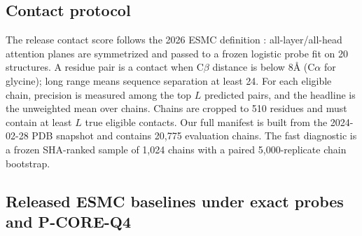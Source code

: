 \documentclass{article}
\begin{document}
\subsection{Contact protocol}

The release contact score follows the 2026 ESMC definition
\citep{candido2026language,rao2021unsupervised}: all-layer/all-head attention
planes are symmetrized and passed to a frozen logistic probe fit on 20
structures. A residue pair is a contact when C$\beta$ distance is below
8\AA{} (C$\alpha$ for glycine); long range means sequence separation at least
24. For each eligible chain, precision is measured among the top $L$ predicted
pairs, and the headline is the unweighted mean over chains. Chains are cropped
to 510 residues and must contain at least $L$ true eligible contacts. Our full
manifest is built from the 2024-02-28 PDB snapshot and contains 20,775
evaluation chains. The fast diagnostic is a frozen SHA-ranked sample of 1,024
chains with a paired 5,000-replicate chain bootstrap.

\subsection{Released ESMC baselines under exact probes and P-CORE-Q4}
\end{document}
